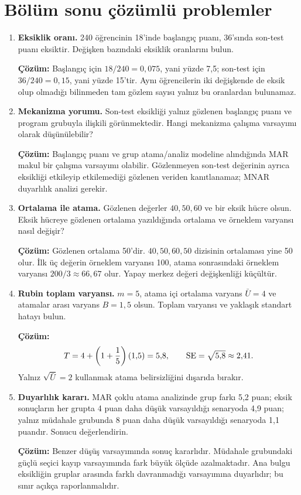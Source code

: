 \section{Bölüm sonu çözümlü problemler}

\begin{enumerate}
  \item \textbf{Eksiklik oranı.} 240 öğrencinin 18'inde başlangıç puanı,
  36'sında son-test puanı eksiktir. Değişken bazındaki eksiklik oranlarını
  bulun.

  \textbf{Çözüm:} Başlangıç için $18/240=0{,}075$, yani yüzde 7,5; son-test
  için $36/240=0{,}15$, yani yüzde 15'tir. Aynı öğrencilerin iki değişkende de
  eksik olup olmadığı bilinmeden tam gözlem sayısı yalnız bu oranlardan
  bulunamaz.

  \item \textbf{Mekanizma yorumu.} Son-test eksikliği yalnız gözlenen
  başlangıç puanı ve program grubuyla ilişkili görünmektedir. Hangi mekanizma
  çalışma varsayımı olarak düşünülebilir?

  \textbf{Çözüm:} Başlangıç puanı ve grup atama/analiz modeline alındığında MAR
  makul bir çalışma varsayımı olabilir. Gözlenmeyen son-test değerinin ayrıca
  eksikliği etkileyip etkilemediği gözlenen veriden kanıtlanamaz; MNAR
  duyarlılık analizi gerekir.

  \item \textbf{Ortalama ile atama.} Gözlenen değerler $40,50,60$ ve bir eksik
  hücre olsun. Eksik hücreye gözlenen ortalama yazıldığında ortalama ve
  örneklem varyansı nasıl değişir?

  \textbf{Çözüm:} Gözlenen ortalama 50'dir. $40,50,60,50$ dizisinin ortalaması
  yine 50 olur. İlk üç değerin örneklem varyansı 100, atama sonrasındaki
  örneklem varyansı $200/3\approx66{,}67$ olur. Yapay merkez değeri değişkenliği
  küçültür.

  \item \textbf{Rubin toplam varyansı.} $m=5$, atama içi ortalama varyans
  $\bar U=4$ ve atamalar arası varyans $B=1{,}5$ olsun. Toplam varyansı ve
  yaklaşık standart hatayı bulun.

  \textbf{Çözüm:}
  \[
  T=4+\left(1+\frac15\right)(1{,}5)=5{,}8,
  \qquad \operatorname{SE}=\sqrt{5{,}8}\approx2{,}41.
  \]
  Yalnız $\sqrt{\bar U}=2$ kullanmak atama belirsizliğini dışarıda bırakır.

  \item \textbf{Duyarlılık kararı.} MAR çoklu atama analizinde grup farkı 5,2
  puan; eksik sonuçların her grupta 4 puan daha düşük varsayıldığı senaryoda
  4,9 puan; yalnız müdahale grubunda 8 puan daha düşük varsayıldığı senaryoda
  1,1 puandır. Sonucu değerlendirin.

  \textbf{Çözüm:} Benzer düşüş varsayımında sonuç kararlıdır. Müdahale
  grubundaki güçlü seçici kayıp varsayımında fark büyük ölçüde azalmaktadır.
  Ana bulgu eksikliğin gruplar arasında farklı davranmadığı varsayımına
  duyarlıdır; bu sınır açıkça raporlanmalıdır.
\end{enumerate}